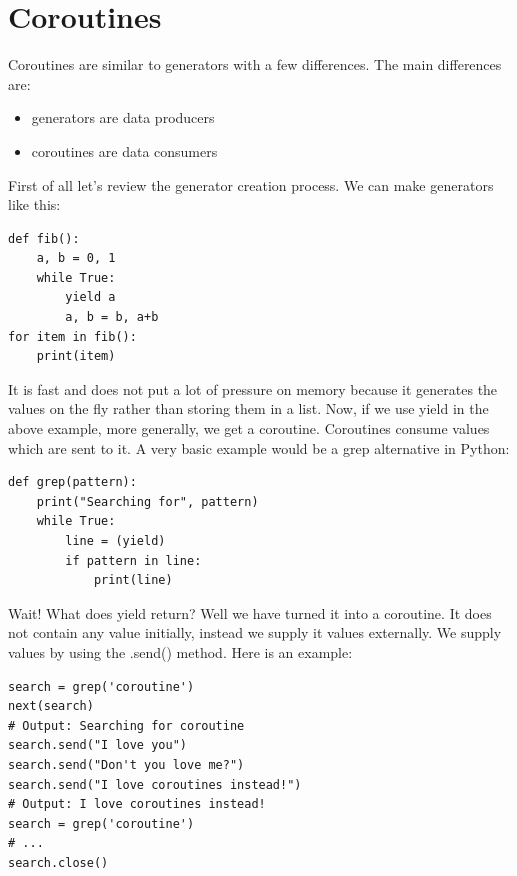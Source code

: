 \documentclass{report}
\begin{document}
    \pagebreak \bigbreak \noindent 
    \section{Coroutines}
    \bigbreak \noindent 
    Coroutines are similar to generators with a few differences. The main differences are:
    \begin{itemize}
        \item generators are data producers
        \item coroutines are data consumers
    \end{itemize}
    \bigbreak \noindent 
    First of all let’s review the generator creation process. We can make generators like this:
    \bigbreak \noindent 
    \begin{mdframed}
        \begin{verbatim}
def fib():
    a, b = 0, 1
    while True:
        yield a
        a, b = b, a+b
for item in fib():
    print(item)
        \end{verbatim}
    \end{mdframed}
    \bigbreak \noindent 
    It is fast and does not put a lot of pressure on memory because it generates the values on the fly rather than storing them in a list. Now, if we use yield in the above example, more generally, we get a coroutine. Coroutines consume values which are sent to it. A very basic example would be a grep alternative in Python:
    \bigbreak \noindent 
    \begin{mdframed}
        \begin{verbatim}
def grep(pattern):
    print("Searching for", pattern)
    while True:
        line = (yield)
        if pattern in line:
            print(line)

        \end{verbatim}
    \end{mdframed}
    \bigbreak \noindent 
    Wait! What does yield return? Well we have turned it into a coroutine. It does not contain any value initially, instead we supply it values externally. We supply values by using the .send() method. Here is an example:
    \bigbreak \noindent 
    \begin{mdframed}
        \begin{verbatim}
search = grep('coroutine')
next(search)
# Output: Searching for coroutine
search.send("I love you")
search.send("Don't you love me?")
search.send("I love coroutines instead!")
# Output: I love coroutines instead!
search = grep('coroutine')
# ...
search.close()
        \end{verbatim}
    \end{mdframed}
\end{document}
